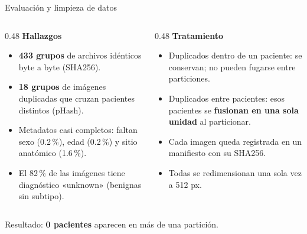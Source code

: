 \documentclass[aspectratio=169,10pt]{beamer}
\begin{document}
\begin{frame}{Evaluación y limpieza de datos}
  \begin{columns}[T]
    \begin{column}{0.48\textwidth}
      \textbf{Hallazgos}
      \begin{itemize}
        \item \textbf{433 grupos} de archivos idénticos byte a byte (SHA256).
        \item \textbf{18 grupos} de imágenes duplicadas que cruzan pacientes distintos (pHash).
        \item Metadatos casi completos: faltan sexo (0.2\,\%), edad (0.2\,\%) y sitio anatómico (1.6\,\%).
        \item El 82\,\% de las imágenes tiene diagnóstico «unknown» (benignas sin subtipo).
      \end{itemize}
    \end{column}
    \begin{column}{0.48\textwidth}
      \textbf{Tratamiento}
      \begin{itemize}
        \item Duplicados dentro de un paciente: se conservan; no pueden fugarse entre particiones.
        \item Duplicados entre pacientes: esos pacientes se \textbf{fusionan en una sola unidad} al particionar.
        \item Cada imagen queda registrada en un manifiesto con su SHA256.
        \item Todas se redimensionan una sola vez a 512 px.
      \end{itemize}
    \end{column}
  \end{columns}
  \vspace{0.8em}
  \begin{center}
    \small Resultado: \textbf{0 pacientes} aparecen en más de una partición.
  \end{center}
\end{frame}
\end{document}
